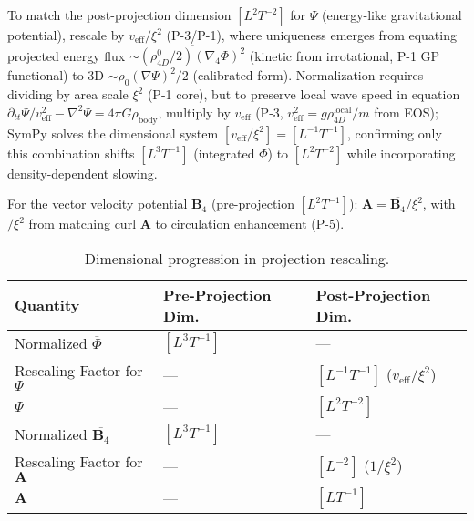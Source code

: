 To match the post-projection dimension $[L^2 T^{-2}]$ for $\Psi$ (energy-like gravitational potential), rescale by $v_{\text{eff}} / \xi^2$ (P-3/P-1), where uniqueness emerges from equating projected energy flux $\sim \overline{(\rho_{4D}^0 / 2) (\nabla_4 \Phi)^2}$ (kinetic from irrotational, P-1 GP functional) to 3D $\sim \rho_0 (\nabla \Psi)^2 / 2$ (calibrated form). Normalization requires dividing by area scale $\xi^2$ (P-1 core), but to preserve local wave speed in equation $\partial_{tt} \Psi / v_{\text{eff}}^2 - \nabla^2 \Psi = 4\pi G \rho_{\text{body}}$, multiply by $v_{\text{eff}}$ (P-3, $v_{\text{eff}}^2 = g \rho_{4D}^{\text{local}} / m$ from EOS); SymPy solves the dimensional system $[v_{\text{eff}} / \xi^2] = [L^{-1} T^{-1}]$, confirming only this combination shifts $[L^3 T^{-1}]$ (integrated $\Phi$) to $[L^2 T^{-2}]$ while incorporating density-dependent slowing.

For the vector velocity potential $\mathbf{B}_4$ (pre-projection $[L^2 T^{-1}]$): $\mathbf{A} = \overline{\mathbf{B}_4} / \xi^2$, with $/ \xi^2$ from matching curl $\mathbf{A}$ to circulation enhancement (P-5).

\begin{table}[H]
\centering
\begin{tabular}{|l|l|l|}
\hline
Quantity & Pre-Projection Dim. & Post-Projection Dim. \\
\hline
Normalized $\overline{\Phi}$ & $[L^3 T^{-1}]$ & --- \\
Rescaling Factor for $\Psi$ & --- & $[L^{-1} T^{-1}]$ ($v_{\text{eff}} / \xi^2$) \\
$\Psi$ & --- & $[L^2 T^{-2}]$ \\
Normalized $\overline{\mathbf{B}_4}$ & $[L^3 T^{-1}]$ & --- \\
Rescaling Factor for $\mathbf{A}$ & --- & $[L^{-2}]$ ($1 / \xi^2$) \\
$\mathbf{A}$ & --- & $[L T^{-1}]$ \\
\hline
\end{tabular}
\caption{Dimensional progression in projection rescaling.}
\label{tab:dim-projection}
\end{table}

\medskip
\noindent
{}
\medskip

